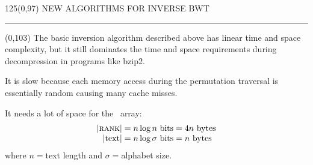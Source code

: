 \begin{textblock}{125}(0,97)
\sffamily\normalsize{\color{sciorange}NEW ALGORITHMS FOR INVERSE BWT}\small\\
\rule[3mm]{125mm}{0.1pt}
\end{textblock} 


\begin{textblock}{60}(0,103) 
  \footnotesize 
  The basic inversion algorithm described above has linear time and
  space complexity, but it still dominates the time and space
  requirements during decompression in programs like bzip2.
  \vspace{1mm}

  It is slow because each memory access during the permutation 
  traversal is essentially random causing many cache misses.
  \vspace{1mm}

  It needs a lot of space for the \rank\ array:
  \begin{align*}
    |\textsc{rank}| &= n\log n \textrm{ bits} = 4n \textrm{ bytes}\\[-1mm]
    |\textrm{text}| &= n\log\sigma \textrm{ bits} = n \textrm{ bytes}
  \end{align*}
  where $n={}$text length and $\sigma={}$alphabet size.
\end{textblock}

